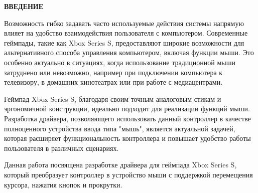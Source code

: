 \begin{center}
    \textbf{ВВЕДЕНИЕ}
\end{center}

Возможность гибко задавать часто используемые действия системы напрямую влияет на удобство взаимодействия пользователя с компьютером. Современные геймпады, такие как Xbox Series S, предоставляют широкие возможности для альтернативного способа управления компьютером, включая функции мыши. Это особенно актуально в ситуациях, когда использование традиционной мыши затруднено или невозможно, например при подключении компьютера к телевизору, в домашних кинотеатрах или при работе с медиацентрами.

Геймпад Xbox Series S, благодаря своим точным аналоговым стикам и эргономичной конструкции, идеально подходит для реализации функций мыши. Разработка драйвера, позволяющего использовать данный контроллер в качестве полноценного устройства ввода типа "мышь", является актуальной задачей, которая расширяет функциональность контроллера и повышает удобство работы пользователя в различных сценариях.

Данная работа посвящена разработке драйвера для геймпада Xbox Series S, который преобразует контроллер в устройство мыши с поддержкой перемещения курсора, нажатия кнопок и прокрутки.